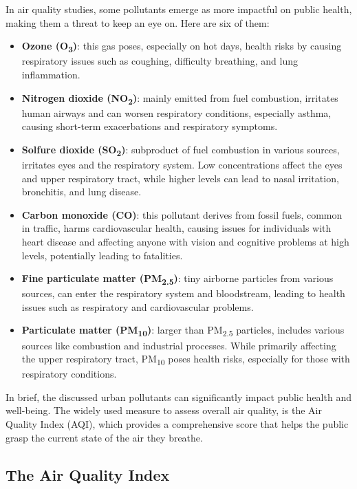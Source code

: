In air quality studies, some pollutants emerge as more impactful on public health, making them a threat to keep an eye on. Here are six of them:
\begin{itemize}
    \item \textbf{Ozone (O\textsubscript{3})}: this gas poses, especially on hot days, health risks by causing respiratory issues such as coughing, difficulty breathing, and lung inflammation.
    \item \textbf{Nitrogen dioxide (NO\textsubscript{2})}: mainly emitted from fuel combustion, irritates human airways and can worsen respiratory conditions, especially asthma, causing short-term exacerbations and respiratory symptoms.
    \item \textbf{Solfure dioxide (SO\textsubscript{2})}: subproduct of fuel combustion in various sources, irritates eyes and the respiratory system. Low concentrations affect the eyes and upper respiratory tract, while higher levels can lead to nasal irritation, bronchitis, and lung disease.
    \item \textbf{Carbon monoxide (CO)}: this pollutant derives from fossil fuels, common in traffic, harms cardiovascular health, causing issues for individuals with heart disease and affecting anyone with vision and cognitive problems at high levels, potentially leading to fatalities.
    \item \textbf{Fine particulate matter (PM\textsubscript{2.5})}: tiny airborne particles from various sources, can enter the respiratory system and bloodstream, leading to health issues such as respiratory and cardiovascular problems.
    \item \textbf{Particulate matter (PM\textsubscript{10})}: larger than PM\textsubscript{2.5} particles, includes various sources like combustion and industrial processes. While primarily affecting the upper respiratory tract, PM\textsubscript{10} poses health risks, especially for those with respiratory conditions. 
\end{itemize}


In brief, the discussed urban pollutants can significantly impact public health and well-being. The widely used measure to assess overall air quality, is the Air Quality Index (AQI), which provides a comprehensive score that helps the public grasp the current state of the air they breathe.

\subsection{The Air Quality Index}

